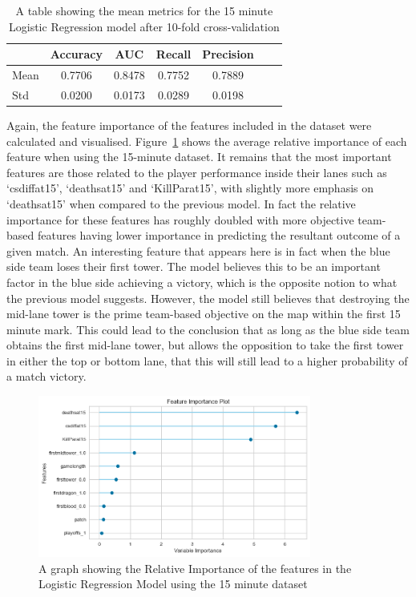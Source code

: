 \begin{table}[h]
    \centering
    \caption{A table showing the mean metrics for the 15 minute Logistic Regression model after 10-fold cross-validation}
    \begin{tabular}{lcccccc}
        \toprule
        \textbf{} & \textbf{Accuracy} & \textbf{AUC} & \textbf{Recall} & \textbf{Precision} \\
        \midrule
        Mean & 0.7706 & 0.8478 & 0.7752 & 0.7889 \\
        Std & 0.0200 & 0.0173 & 0.0289 & 0.0198 \\
        \bottomrule
    \end{tabular}
    \label{tab:Kfold15}
\end{table}

Again, the feature importance of the features included in the dataset were calculated and visualised.
Figure~\ref{fig:FeatureImport15} shows the average relative importance of each feature when using the 15-minute dataset.
It remains that the most important features are those related to the player performance inside their lanes such as `csdiffat15', `deathsat15' and `KillParat15', with slightly more emphasis on `deathsat15' when compared to the previous model.
In fact the relative importance for these features has roughly doubled
with more objective team-based features having lower importance in predicting the resultant outcome of a given match.
An interesting feature that appears here is in fact when the blue side team loses their first tower.
The model believes this to be an important factor in the blue side achieving a victory, which is the opposite notion to what the previous model suggests.
However, the model still believes that destroying the mid-lane tower is the prime team-based objective on the map within the first 15 minute mark.
This could lead to the conclusion that as long as the blue side team obtains the first mid-lane tower, but allows the opposition to take the first tower in either the top or bottom lane, that this will still lead to a higher probability of a match victory. \\


\begin{figure}[h]
    \centering
    \includegraphics[width=0.8\textwidth]{figures/FeatureImport15}
    \caption{A graph showing the Relative Importance of the features in the Logistic Regression Model using the 15 minute dataset}
    \label{fig:FeatureImport15}
\end{figure}

